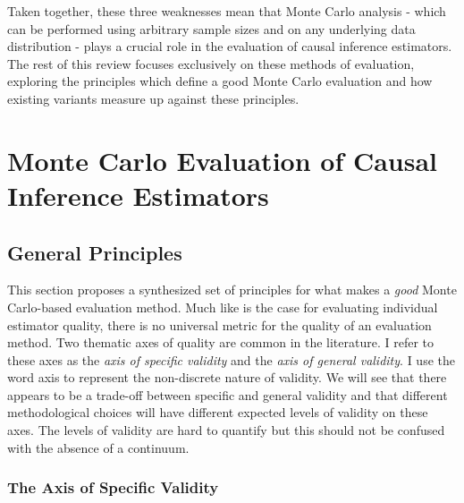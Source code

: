 \documentclass[../main.tex]{subfiles}
\begin{document}
\vspace{\baselineskip}
Taken together, these three weaknesses mean that Monte Carlo analysis - which can be performed using arbitrary sample sizes and on any underlying data distribution - plays a crucial role in the evaluation of causal inference estimators. The rest of this review focuses exclusively on these methods of evaluation, exploring the principles which define a good Monte Carlo evaluation and how existing variants measure up against these principles.\par

\section{Monte Carlo Evaluation of Causal Inference Estimators}
\subsection{General Principles}

\vspace{\baselineskip}
This section proposes a synthesized set of principles for what makes a \textit{good }Monte Carlo-based evaluation method. Much like is the case for evaluating individual estimator quality, there is no universal metric for the quality of an evaluation method. Two thematic axes of quality are common in the literature. I refer to these axes as the \textit{axis of specific validity }and the\textit{ axis of general validity}. I use the word axis to represent the non-discrete nature of validity. We will see that there appears to be a trade-off between specific and general validity and that different methodological choices will have different expected levels of validity on these axes. The levels of validity are hard to quantify but this should not be confused with the absence of a continuum.\par

\subsubsection{The Axis of Specific Validity}
\end{document}
